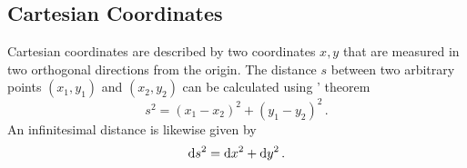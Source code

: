 \subsection*{Cartesian Coordinates}
Cartesian coordinates are described by two coordinates $x,y$ that are measured
in two orthogonal directions from the origin. The distance $s$ between two
arbitrary points $(x_1,y_1)$ and $(x_2,y_2)$ can be calculated using
' theorem
\begin{equation}
    s^2=(x_1-x_2)^2+(y_1-y_2)^2\,.
\end{equation}
An infinitesimal distance is likewise given by
\begin{equation}
    \dif s^2=\dif x^2+\dif y^2\,.  \label{eq:cartline}
\end{equation}
